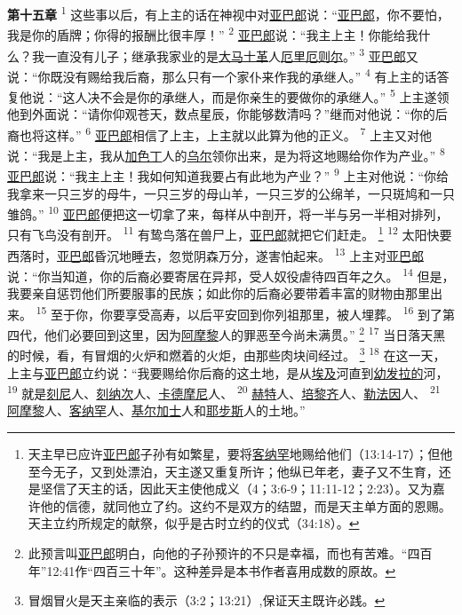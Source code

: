 \textbf{第十五章\quad}
\textsuperscript{1}
这些事以后，有上主的话在神视中对\uline{亚巴郎}说：“\uline{亚巴郎}，你不要怕，我是你的盾牌；你得的报酬比很丰厚！”
\textsuperscript{2}
\uline{亚巴郎}说：“我主上主！你能给我什么？我一直没有儿子；继承我家业的是\uline{大马}\uline{士革}人\uline{厄里}\uline{厄则尔}。”
\textsuperscript{3}
\uline{亚巴郎}又说：“你既没有赐给我后裔，那么只有一个家仆来作我的承继人。”
\textsuperscript{4}
有上主的话答复他说：“这人决不会是你的承继人，而是你亲生的要做你的承继人。”
\textsuperscript{5}
上主遂领他到外面说：“请你仰观苍天，数点星辰，你能够数清吗？”继而对他说：“你的后裔也将这样。”
\textsuperscript{6}
\uline{亚巴郎}相信了上主，上主就以此算为他的正义。
\textsuperscript{7}
上主又对他说：“我是上主，我从\uline{加色丁}人的\uline{乌尔}领你出来，是为将这地赐给你作为产业。”
\textsuperscript{8}
\uline{亚巴郎}说：“我主上主！我如何知道我要占有此地为产业？”
\textsuperscript{9}
上主对他说：“你给我拿来一只三岁的母牛，一只三岁的母山羊，一只三岁的公绵羊，一只斑鸠和一只雏鸽。”
\textsuperscript{10}
\uline{亚巴郎}便把这一切拿了来，每样从中剖开，将一半与另一半相对排列，只有飞鸟没有剖开。
\textsuperscript{11}
有鸷鸟落在兽尸上，\uline{亚巴郎}就把它们赶走。
\footnote{天主早已应许\uline{亚巴郎}子孙有如繁星，要将\uline{客纳罕}地赐给他们（13:14-17）；但他至今无子，又到处漂泊，天主遂又重复所许；他纵已年老，妻子又不生育，还是坚信了天主的话，因此天主使他成义（4；3:6-9；11:11-12；2:23）。又为嘉许他的信德，就同他立了约。这约不是双方的结盟，而是天主单方面的恩赐。天主立约所规定的献祭，似乎是古时立约的仪式（34:18）。}
\textsuperscript{12}
太阳快要西落时，\uline{亚巴郎}昏沉地睡去，忽觉阴森万分，遂害怕起来。
\textsuperscript{13}
上主对\uline{亚巴郎}说：“你当知道，你的后裔必要寄居在异邦，受人奴役虐待四百年之久。
\textsuperscript{14}
但是，我要亲自惩罚他们所要服事的民族；如此你的后裔必要带着丰富的财物由那里出来。
\textsuperscript{15}
至于你，你要享受高寿，以后平安回到你列祖那里，被人埋葬。
\textsuperscript{16}
到了第四代，他们必要回到这里，因为\uline{阿摩黎}人的罪恶至今尚未满贯。”
\footnote{此预言叫\uline{亚巴郎}明白，向他的子孙预许的不只是幸福，而也有苦难。“四百年”12:41作“四百三十年”。这种差异是本书作者喜用成数的原故。}
\textsuperscript{17}
当日落天黑的时候，看，有冒烟的火炉和燃着的火炬，由那些肉块间经过。
\footnote{冒烟冒火是天主亲临的表示（3:2；13:21）,保证天主既许必践。}
\textsuperscript{18}
在这一天，上主与\uline{亚巴郎}立约说：“我要赐给你后裔的这土地，是从\uline{埃及}河直到\uline{幼发拉的}河，
\textsuperscript{19}
就是\uline{刻尼}人、\uline{刻纳次}人、\uline{卡德}\uline{摩尼}人、
\textsuperscript{20}
\uline{赫特}人、\uline{培黎齐}人、\uline{勒法因}人、
\textsuperscript{21}
\uline{阿摩黎}人、\uline{客纳罕}人、\uline{基尔加}\uline{士}人和\uline{耶步斯}人的土地。”

